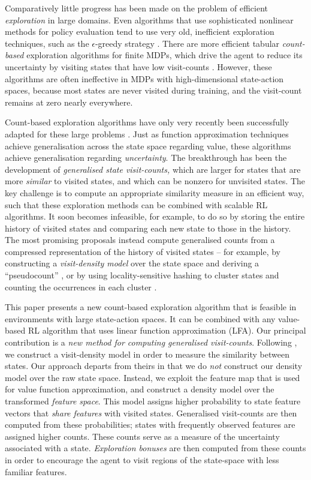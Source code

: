 \documentclass{article}
\theoremstyle{definition}
\theoremstyle{definition}
\theoremstyle{plain}
\theoremstyle{plain}
\theoremstyle{plain}
\begin{document}
Comparatively little progress has been made on the problem of efficient
\emph{exploration} in large domains. Even algorithms that use sophisticated
nonlinear methods for policy evaluation tend to use very old, inefficient
exploration techniques, such as the $\epsilon$-greedy strategy \cite{HGS:2016doubleQ,MBMG+2016DQN,DBLP:journals/corr/NairSBAFMPSBPLM15}.
There are more efficient tabular \emph{count-based }exploration algorithms
for finite MDPs, which drive the agent to reduce its uncertainty by
visiting states that have low visit-counts \cite{Strehl2008}. However,
these algorithms are often ineffective in MDPs with high-dimensional
state-action spaces, because most states are never visited during
training, and the visit-count remains at zero nearly everywhere.

Count-based exploration algorithms have only very recently been successfully
adapted for these large problems \cite{Bellemare2016,Tang2016exploration}.
Just as function approximation techniques achieve generalisation across
the state space regarding value, these algorithms achieve generalisation
regarding \emph{uncertainty}. The breakthrough has been the development
of \emph{generalised state visit-counts, }which are larger for states
that are more \emph{similar} to visited states, and which can be nonzero
for unvisited states. The key challenge is to compute an appropriate
similarity measure in an efficient way, such that these exploration
methods can be combined with scalable RL algorithms. It soon becomes
infeasible, for example, to do so by storing the entire history of
visited states and comparing each new state to those in the history.
The most promising proposals instead compute generalised counts from
a compressed representation of the history of visited states -- for
example, by constructing a \emph{visit-density model} over the state
space and deriving a ``pseudocount'' \cite{Bellemare2016,DBLP:journals/corr/OstrovskiBOM17},
or by using locality-sensitive hashing to cluster states and counting
the occurrences in each cluster \cite{Tang2016exploration}.

This paper presents a new count-based exploration algorithm that is
feasible in environments with large state-action spaces. It can be
combined with any value-based RL algorithm that uses linear function
approximation (LFA). Our principal contribution is a \emph{new method
for computing generalised visit-counts}. Following \cite{Bellemare2016},
we construct a visit-density model in order to measure the similarity
between states. Our approach departs from theirs in that we do \emph{not}
construct our density model over\emph{ }the raw state space. Instead,
we exploit the feature map that is used for value function approximation,
and construct a density model over the transformed \emph{feature space}.
This model assigns higher probability to state feature vectors that
\emph{share features} with visited states. Generalised visit-counts
are then computed from these probabilities; states with frequently
observed features are assigned higher counts. These counts serve as
a measure of the uncertainty associated with a state. \emph{Exploration
bonuses} are then computed from these counts in order to encourage
the agent to visit regions of the state-space with less familiar features.
\end{document}

